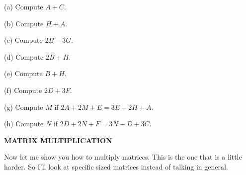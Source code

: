 (a) Compute $A + C$.

(b) Compute $H + A$.

(c) Compute $2B - 3G$.

(d) Compute $2B + H$.

(e) Compute $B + H$.

(f) Compute $2D + 3F$.

(g) Compute $M$ if $2A + 2M + E = 3E - 2H + A$.

(h) Compute $N$ if $2D + 2N + F = 3N - D + 3C$.



\newpage

{\bf MATRIX MULTIPLICATION}

Now let me show you how to multiply matrices.
This is the one that is a little harder.
So I'll look at specific sized matrices instead of talking in general.

